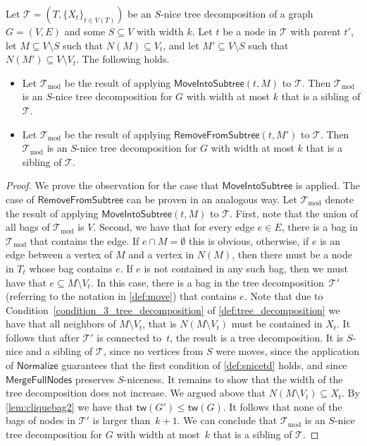 \documentclass[a4paper,UKenglish,cleveref, autoref, thm-restate, numberwithinsect]{lipics-v2021}
\newcommand{\tw}{\mathsf{tw}}
\newcommand{\Normalize}{\mathsf{Normalize}}
\newcommand{\MoveIntoSubtree}{\mathsf{MoveIntoSubtree}}
\newcommand{\RemoveFromSubtree}{\mathsf{RemoveFromSubtree}}
\newcommand{\MergeFullNodes}{\mathsf{MergeFullNodes}}
\begin{document}
 \begin{observation} \label{lem:moveremove}
     Let $\mathcal{T}=(T,\{X_t\}_{t\in V(T)})$ be an $S$-nice tree decomposition of a graph $G=(V,E)$ and some $S\subseteq V$ with width $k$. Let $t$ be a node in $\mathcal{T}$ with parent $t'$, let $M\subseteq V\setminus S$ such that $N(M)\subseteq V_{t}$, and let $M'\subseteq V\setminus S$ such that $N(M')\subseteq V\setminus V_{t}$. The following holds.
     \begin{itemize}
     \item Let $\mathcal{T}_{\text{mod}}$ be the result of applying $\MoveIntoSubtree(t, M)$ to $\mathcal{T}$. Then $\mathcal{T}_{\text{mod}}$ is an $S$-nice tree decomposition for $G$ with width at most $k$ that is a sibling of $\mathcal{T}$. 
     \item Let $\mathcal{T}_{\text{mod}}$ be the result of applying $\RemoveFromSubtree(t, M')$ to $\mathcal{T}$. Then $\mathcal{T}_{\text{mod}}$ is an $S$-nice tree decomposition for $G$ with width at most $k$ that is a sibling of $\mathcal{T}$.
     \end{itemize}    
 \end{observation}
 \begin{proof}
We prove the observation for the case that $\MoveIntoSubtree$ is applied. The case of $\RemoveFromSubtree$ can be proven in an analogous way. 
Let $\mathcal{T}_{\text{mod}}$ denote the result of applying $\MoveIntoSubtree(t, M)$ to $\mathcal{T}$.
First, note that the union of all bags of $\mathcal{T}_{\text{mod}}$ is $V$. Second, we have that for every edge $e\in E$, there is a bag in $\mathcal{T}_{\text{mod}}$ that contains the edge. If $e\cap M=\emptyset$ this is obvious, otherwise, if $e$ is an edge between a vertex of $M$ and a vertex in $N(M)$, then there must be a node in $T_t$ whose bag contains $e$. If $e$ is not contained in any such bag, then we must have that $e\subseteq M\setminus V_t$. In this case, there is a bag in the tree decomposition~$\mathcal{T}'$ (referring to the notation in \cref{def:move}) that contains $e$. Note that due to Condition~\ref{condition_3_tree_decomposition} of \cref{def:tree_decomposition} we have that all neighbors of $M\setminus V_{t}$, that is $N(M\setminus V_{t})$ must be contained in $X_t$. It follows that after $\mathcal{T'}$ is connected to~$t$, the result is a tree decomposition. It is $S$-nice and a sibling of $\mathcal{T}$, since no vertices from $S$ were moves, since the application of $\Normalize$ guarantees that the first condition of \cref{def:snicetd} holds, and since $\MergeFullNodes$ preserves $S$-niceness. It remains to show that the width of the tree decomposition does not increase. We argued above that $N(M\setminus V_{t})\subseteq X_t$. By \cref{lem:cliquebag2} we have that $\tw(G')\le \tw(G)$. It follows that none of the bags of nodes in $\mathcal{T}'$ is larger than~$k+1$. We can conclude that $\mathcal{T}_{\text{mod}}$ is an $S$-nice tree decomposition for $G$ with width at most~$k$ that is a sibling of $\mathcal{T}$.
 \end{proof}
\end{document}
